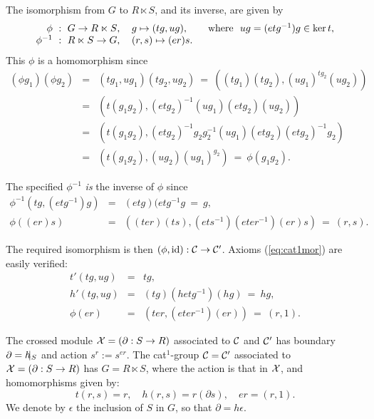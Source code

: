 \begin{pf} 
The isomorphism from $G$ to $R \ltimes S$, and its inverse, are given by 
\begin{equation} \label{eq:cat1-sdp-fact} 
\begin{tabular}{r l}
$\phi ~:~ G \to R \ltimes S$, & $g \mapsto (tg,ug),
\qquad\mbox{where}~~  ug = (etg^{-1})g \in \ker t$, \\ 
$\phi^{-1} ~:~ R \ltimes S \to G$, & $(r,s) \mapsto (er)s$.
\end{tabular}
\end{equation}
This $\phi$ is a homomorphism since 
\begin{eqnarray*}
(\phi g_1)(\phi g_2) 
&=& (tg_1,ug_1)(tg_2,ug_2) 
~=~ \left( (tg_1)(tg_2), (ug_1)^{tg_2}(ug_2) \right) \\ 
&=& \left( t(g_1g_2), (etg_2)^{-1}(ug_1)(etg_2)(ug_2) \right) \\
&=& \left( t(g_1g_2), (etg_2)^{-1}g_2g_2^{-1}(ug_1)(etg_2)(etg_2)^{-1}g_2 \right) \\ 
&=& \left( t(g_1g_2), (ug_2)(ug_1)^{g_2} \right) 
~=~ \phi(g_1g_2).
\end{eqnarray*} 

\noindent 
The specified $\phi^{-1}$ \emph{is} the inverse of $\phi$ since 
\begin{eqnarray*}
\phi^{-1}(tg,(etg^{-1})g) 
&=& (etg)(etg^{-1}g ~=~ g, \\ 
\phi((er)s) 
&=& \left((ter)(ts), (ets^{-1})(eter^{-1})(er)s\right) 
~=~ (r,s). 
\end{eqnarray*}

\noindent 
The required isomorphism is then $(\phi,\mathrm{id}) : \mathcal{C} \to \mathcal{C}'$. 
Axioms (\ref{eq:cat1mor}) are easily verified: 
\begin{eqnarray*}
t'(tg,ug) &=& tg, \\ 
h'(tg,ug) &=& (tg)(hetg^{-1})(hg) ~=~ hg, \\ 
\phi(er)  &=& (ter,(eter^{-1})(er)) ~=~ (r,1). 
\end{eqnarray*}
\end{pf}

The crossed module $\mathcal{X} = (\partial : S \to R)$  
associated to  $\mathcal{C}$  and  $\mathcal{C}'$  has boundary 
$\partial = h\hspace{-5pt}\mid_S$ and action $s^r := s^{er}$. 
The cat$^1$-group  $\mathcal{C} = \mathcal{C}'$  associated to  
$\mathcal{X} = (\partial : S \to R)$  has  $G = R \ltimes S$, 
where the action is that in  $\mathcal{X}$,
and homomorphisms given by:
\begin{equation} \label{eq:xmodofcat1}
t(r,s) = r, \quad h(r,s) = r(\partial s), \quad er = (r,1). 
\end{equation}
We denote by  $\epsilon$  the inclusion of  $S$  in  $G$,
so that  $\partial = h \epsilon$.

